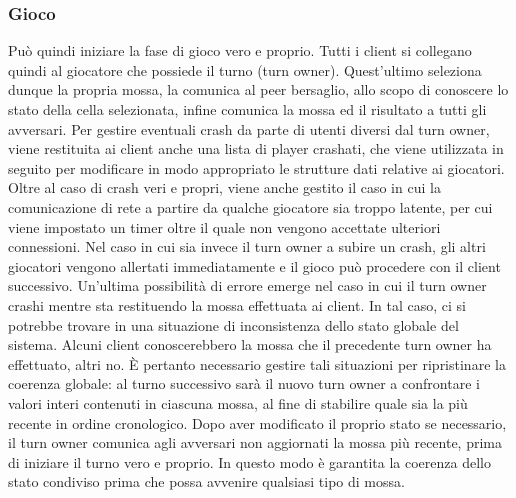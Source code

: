 \subsubsection{Gioco}
Può quindi iniziare la fase di gioco vero e proprio. Tutti i client si 
collegano quindi al giocatore che possiede il turno (turn owner). %
Quest'ultimo seleziona dunque la propria mossa, la comunica al peer bersaglio, 
allo scopo di conoscere lo stato della cella selezionata, infine comunica la 
mossa ed il risultato a tutti gli avversari. Per gestire eventuali crash 
da parte di utenti diversi dal turn owner, viene restituita ai client anche una 
lista di player crashati, che viene utilizzata in seguito per modificare in 
modo appropriato le strutture dati relative ai giocatori. Oltre al caso di crash 
veri e propri, viene anche gestito il caso in cui la comunicazione di rete a 
partire da qualche giocatore sia troppo latente, per cui viene impostato un 
timer oltre il quale non vengono accettate ulteriori connessioni.
Nel caso in cui sia invece il turn owner a subire un crash, gli altri giocatori 
vengono allertati immediatamente e il gioco può procedere con il client 
successivo.
Un'ultima possibilità di errore emerge nel caso in cui il turn owner crashi 
mentre sta restituendo la mossa effettuata ai client. In tal caso, ci 
si potrebbe trovare in una situazione di inconsistenza dello stato globale del 
sistema. Alcuni client conoscerebbero la mossa che il precedente turn owner ha 
effettuato, altri no. È pertanto necessario gestire tali situazioni per 
ripristinare la coerenza globale: al turno successivo sarà il nuovo turn owner 
a confrontare i valori interi contenuti in ciascuna mossa, al fine di 
stabilire quale sia la più recente in ordine cronologico.
Dopo aver modificato il proprio stato se necessario, il turn owner comunica agli 
avversari non aggiornati la mossa più 
recente, prima di iniziare il turno vero e proprio. In questo modo è garantita 
la coerenza dello stato condiviso prima che possa avvenire qualsiasi tipo di 
mossa.
